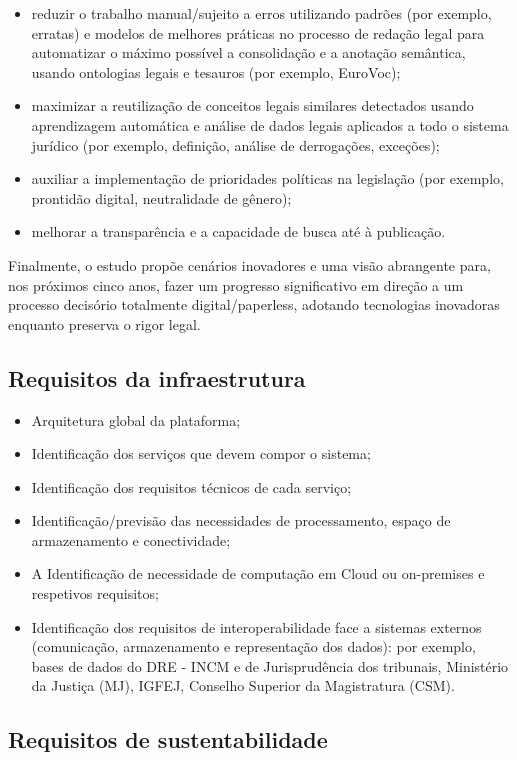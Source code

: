 \begin{itemize}

\item reduzir o trabalho manual/sujeito a erros utilizando padrões (por exemplo, erratas) e modelos 
de melhores práticas no processo de redação legal para automatizar o máximo possível a consolidação 
e a anotação semântica, usando ontologias legais e tesauros (por exemplo, EuroVoc);
\item maximizar a reutilização de conceitos legais similares detectados usando aprendizagem automática 
e análise de dados legais aplicados a todo o sistema jurídico (por exemplo, definição, 
análise de derrogações, exceções);
\item auxiliar a implementação de prioridades políticas na legislação (por exemplo, prontidão digital, 
neutralidade de gênero); 
\item melhorar a transparência e a capacidade de busca até à publicação.

\end{itemize}

Finalmente, o estudo propõe cenários inovadores e uma visão abrangente para, nos próximos cinco anos, 
fazer um progresso significativo em direção a um processo decisório totalmente digital/paperless, 
adotando tecnologias inovadoras enquanto preserva o rigor legal.


\subsection{Requisitos da infraestrutura}

\begin{itemize}
\item Arquitetura global da plataforma;
\item Identificação dos serviços que devem compor o sistema;
\item Identificação dos requisitos técnicos de cada serviço;
\item Identificação/previsão das necessidades de processamento, espaço de armazenamento e
conectividade;
\item A Identificação de necessidade de computação em Cloud ou on-premises e respetivos
requisitos;
\item Identificação dos requisitos de interoperabilidade face a sistemas externos (comunicação,
armazenamento e representação dos dados): por exemplo, bases de dados do DRE - INCM e
de Jurisprudência dos tribunais, Ministério da Justiça (MJ), IGFEJ, 
Conselho Superior da Magistratura (CSM).
\end{itemize}


\subsection{Requisitos de sustentabilidade}



